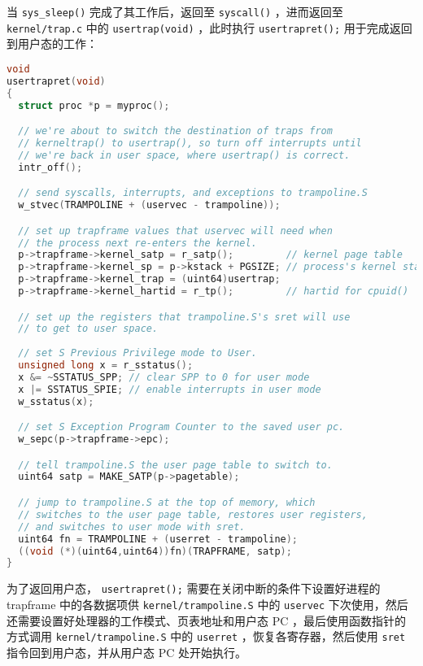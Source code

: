 当 \lstinline{sys_sleep()} 完成了其工作后，返回至 \lstinline{syscall()} ，进而返回至 \lstinline{kernel/trap.c} 中的 \lstinline{usertrap(void)} ，此时执行 \lstinline{usertrapret();} 用于完成返回到用户态的工作：
\begin{lstlisting}[language=C]
void
usertrapret(void)
{
  struct proc *p = myproc();

  // we're about to switch the destination of traps from
  // kerneltrap() to usertrap(), so turn off interrupts until
  // we're back in user space, where usertrap() is correct.
  intr_off();

  // send syscalls, interrupts, and exceptions to trampoline.S
  w_stvec(TRAMPOLINE + (uservec - trampoline));

  // set up trapframe values that uservec will need when
  // the process next re-enters the kernel.
  p->trapframe->kernel_satp = r_satp();         // kernel page table
  p->trapframe->kernel_sp = p->kstack + PGSIZE; // process's kernel stack
  p->trapframe->kernel_trap = (uint64)usertrap;
  p->trapframe->kernel_hartid = r_tp();         // hartid for cpuid()

  // set up the registers that trampoline.S's sret will use
  // to get to user space.
  
  // set S Previous Privilege mode to User.
  unsigned long x = r_sstatus();
  x &= ~SSTATUS_SPP; // clear SPP to 0 for user mode
  x |= SSTATUS_SPIE; // enable interrupts in user mode
  w_sstatus(x);

  // set S Exception Program Counter to the saved user pc.
  w_sepc(p->trapframe->epc);

  // tell trampoline.S the user page table to switch to.
  uint64 satp = MAKE_SATP(p->pagetable);

  // jump to trampoline.S at the top of memory, which 
  // switches to the user page table, restores user registers,
  // and switches to user mode with sret.
  uint64 fn = TRAMPOLINE + (userret - trampoline);
  ((void (*)(uint64,uint64))fn)(TRAPFRAME, satp);
}
\end{lstlisting}


为了返回用户态， \lstinline{usertrapret();} 需要在关闭中断的条件下设置好进程的 trapframe 中的各数据项供 \lstinline{kernel/trampoline.S} 中的 \lstinline{uservec} 下次使用，然后还需要设置好处理器的工作模式、页表地址和用户态 PC ，最后使用函数指针的方式调用 \lstinline{kernel/trampoline.S} 中的 \lstinline{userret} ，恢复各寄存器，然后使用 \lstinline{sret} 指令回到用户态，并从用户态 PC 处开始执行。

